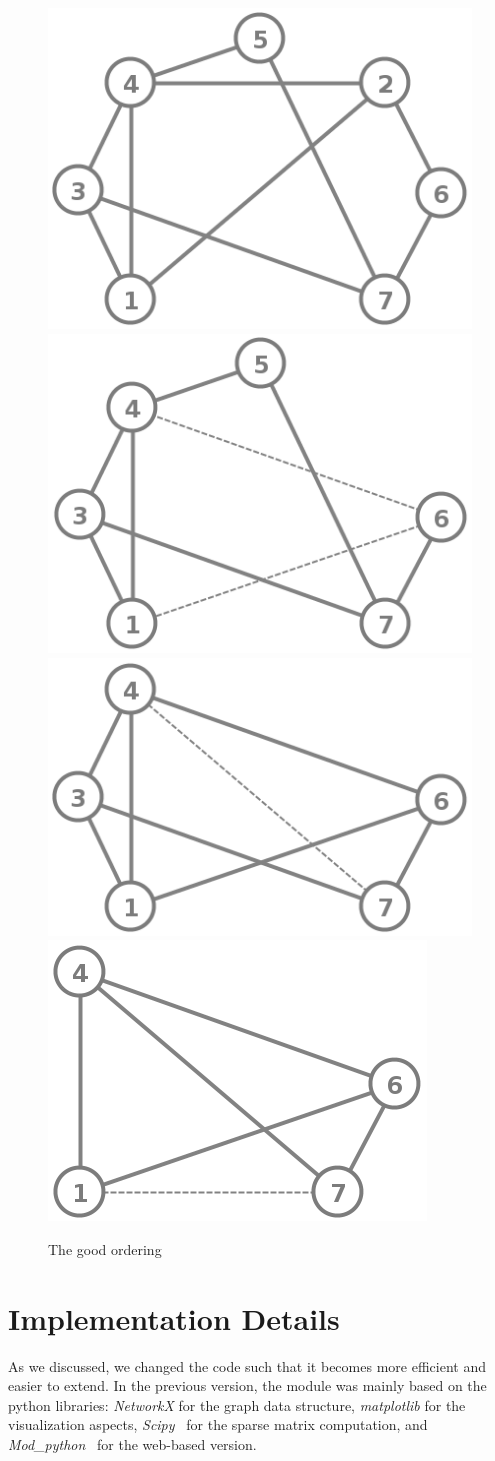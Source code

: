 \documentclass[12pt, oneside]{book}
\begin{document}
\begin{figure}
\centering
   \includegraphics[width=0.4\linewidth]{good_order}
   \hfill
   \includegraphics[width=0.4\linewidth]{good_order_2_removed}
   \includegraphics[width=0.4\linewidth]{good_order_5_2_removed}
   \hfill
   \includegraphics[width=0.25\linewidth]{good_order_3_5_2_removed}
\caption{The good  ordering}
\label{good_order_fillin2}
\end{figure}


\chapter{Implementation Details}
As we discussed, we changed the code such that it becomes more efficient and easier to extend. 
In the previous version, the module was mainly based on the python libraries:
\textit{NetworkX} \cite{networkx2008} for the graph data structure,
\textit{matplotlib} \cite{matplotlib2007} for the visualization aspects,
\textit{Scipy}~\cite{scipy2001} for the sparse matrix computation, and
\textit{Mod\_python}~\cite{modpython2013} for the web-based version. 
\end{document}
